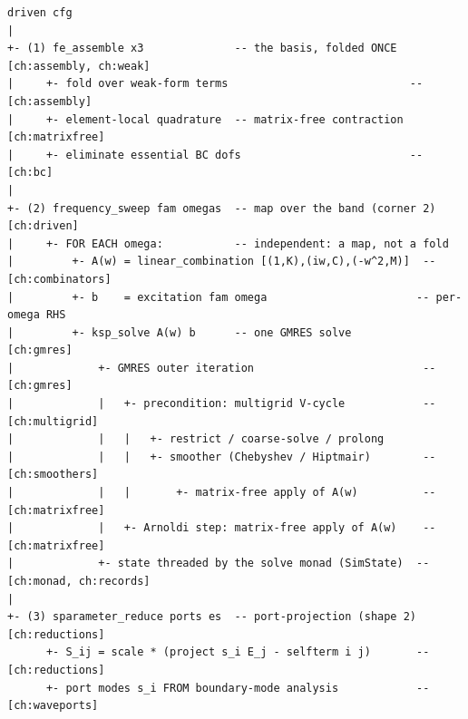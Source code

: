 \begin{lstlisting}[style=l4style]
driven cfg
|
+- (1) fe_assemble x3              -- the basis, folded ONCE   [ch:assembly, ch:weak]
|     +- fold over weak-form terms                            -- [ch:assembly]
|     +- element-local quadrature  -- matrix-free contraction  [ch:matrixfree]
|     +- eliminate essential BC dofs                          -- [ch:bc]
|
+- (2) frequency_sweep fam omegas  -- map over the band (corner 2) [ch:driven]
|     +- FOR EACH omega:           -- independent: a map, not a fold
|         +- A(w) = linear_combination [(1,K),(iw,C),(-w^2,M)]  -- [ch:combinators]
|         +- b    = excitation fam omega                       -- per-omega RHS
|         +- ksp_solve A(w) b      -- one GMRES solve           [ch:gmres]
|             +- GMRES outer iteration                          -- [ch:gmres]
|             |   +- precondition: multigrid V-cycle            -- [ch:multigrid]
|             |   |   +- restrict / coarse-solve / prolong
|             |   |   +- smoother (Chebyshev / Hiptmair)        -- [ch:smoothers]
|             |   |       +- matrix-free apply of A(w)          -- [ch:matrixfree]
|             |   +- Arnoldi step: matrix-free apply of A(w)    -- [ch:matrixfree]
|             +- state threaded by the solve monad (SimState)  -- [ch:monad, ch:records]
|
+- (3) sparameter_reduce ports es  -- port-projection (shape 2) [ch:reductions]
      +- S_ij = scale * (project s_i E_j - selfterm i j)       -- [ch:reductions]
      +- port modes s_i FROM boundary-mode analysis            -- [ch:waveports]
\end{lstlisting}


